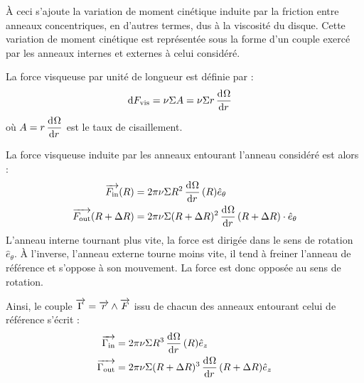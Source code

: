 \bigskip

À ceci s'ajoute la variation de moment cinétique induite par la friction entre anneaux concentriques, en d'autres termes, dus à la viscosité du disque. Cette variation de moment cinétique est représentée sous la forme d'un couple exercé par les anneaux internes et externes à celui considéré. 




La force visqueuse par unité de longueur est définie par :
\begin{align}
\operatorname{d \!} F_\text{vis} &= \nu \Sigma A = \nu \Sigma r \mathinner{ \dfrac{\operatorname{d \!}{^{}}\Omega}{\operatorname{d \!}{{r}^{}}} }
\end{align}
où $A=r \mathinner{ \dfrac{\operatorname{d \!}{^{}}\Omega}{\operatorname{d \!}{{r}^{}}} }$ est le taux de cisaillement.

La force visqueuse induite par les anneaux entourant l'anneau considéré est alors : 
\begin{subequations}
\begin{align}
{\overrightarrow{F_\text{in}}}(R)&= 2\pi\nu \Sigma R^2 \mathinner{ \dfrac{\operatorname{d \!}{^{}}\Omega}{\operatorname{d \!}{{r}^{}}} }(R) \hat{e}_\theta\\
{\overrightarrow{F_\text{out}}}(R+\Delta R)&= 2\pi\nu \Sigma (R+\Delta R)^2 \mathinner{ \dfrac{\operatorname{d \!}{^{}}\Omega}{\operatorname{d \!}{{r}^{}}} }(R+\Delta R) \cdot \hat{e}_\theta
\end{align}
\end{subequations}
L'anneau interne tournant plus vite, la force est dirigée dans le sens de rotation $\hat{e}_\theta$. À l'inverse, l'anneau externe tourne moins vite, il tend à freiner l'anneau de référence et s'oppose à son mouvement. La force est donc opposée au sens de rotation.

\bigskip

Ainsi, le couple ${\overrightarrow{\Gamma}}={\overrightarrow{r}}\wedge{\overrightarrow{F}}$ issu de chacun des anneaux entourant celui de référence s'écrit :
\begin{subequations}
\begin{align}
{\overrightarrow{\Gamma_\text{in}}} &= 2\pi\nu \Sigma R^3 \mathinner{ \dfrac{\operatorname{d \!}{^{}}\Omega}{\operatorname{d \!}{{r}^{}}} }(R) \hat{e}_z\label{eq:G_in}\\
{\overrightarrow{\Gamma_\text{out}}} &= 2\pi\nu \Sigma (R+\Delta R)^3 \mathinner{ \dfrac{\operatorname{d \!}{^{}}\Omega}{\operatorname{d \!}{{r}^{}}} }(R+\Delta R) \hat{e}_z\label{eq:G_out}
\end{align}\label{eq:J_torques}
\end{subequations}

